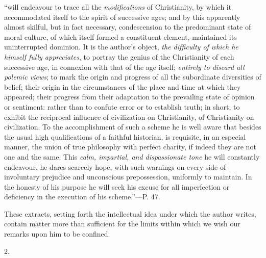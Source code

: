 ``will
endeavour to trace all the \emph{modifications} of Christianity, by
which it accommodated itself to the spirit of successive ages; and by
this apparently almost skilful, but in fact necessary, condescension
to the predominant state of moral culture, of which itself formed a
constituent element, maintained its uninterrupted dominion. It is the
author's object, \emph{the difficulty of which he himself fully
appreciates}, to portray the genius of the Christianity of each
successive age, in connexion with that of the age itself; \emph{entirely
to discard all polemic views}; to mark the origin and progress of
all the subordinate
diversities of belief; their origin in the circumstances of the place
and time at which they appeared; their progress from their adaptation
to the prevailing state of opinion or sentiment: rather than to
confute error or to establish truth; in short, to exhibit the
reciprocal influence of civilization on Christianity, of Christianity
on civilization. To the accomplishment of such a scheme he is well
aware that besides the usual high qualifications of a faithful
historian, is requisite, in an especial manner, the union of true
philosophy with perfect charity, if indeed they are not one and the
same. This \emph{calm, impartial, and dispassionate tone} he will
constantly endeavour, he dares scarcely hope, with such warnings on
every side of involuntary prejudice and unconscious prepossession,
uniformly to maintain. In the honesty of his purpose he will seek his
excuse for all imperfection or deficiency in the execution of his
scheme.''—P. 47.

These extracts, setting forth the intellectual
idea under which the author writes, contain matter more than
sufficient for the limits within which we wish our remarks upon him to
be confined.

2.

